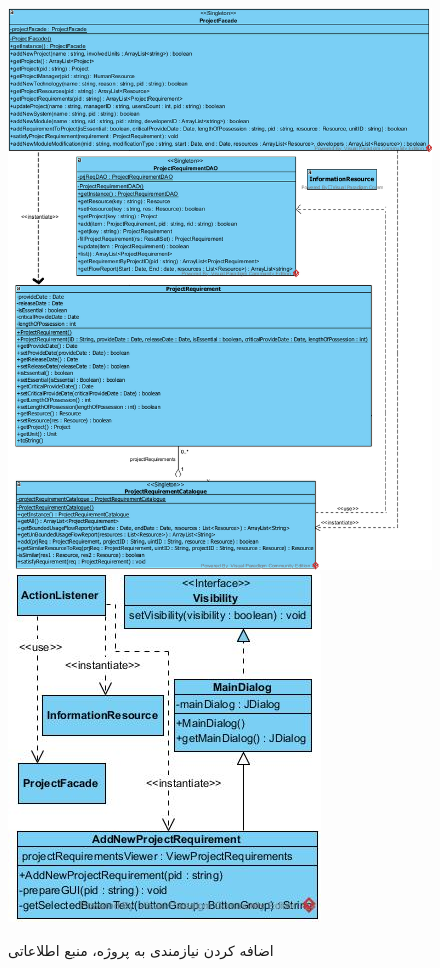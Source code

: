 \begin{landscape}
\begin{figure}[H]
	\includegraphics[scale=0.5]{img/sequence-design/AddRequirementToProject_INFORMATIONC}
	\includegraphics[scale=0.5]{img/sequence-design/AddRequirementToProject_INFORMATIONUI}
	\caption{اضافه کردن نیازمندی به پروژه، منبع اطلاعاتی}
\end{figure}


\end{landscape}
